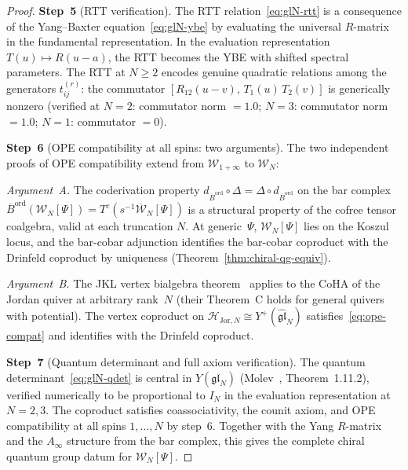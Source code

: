 \documentclass[11pt,reqno]{amsart}
\theoremstyle{definition}
\theoremstyle{remark}
\newcommand{\cH}{\mathcal{H}}
\newcommand{\cW}{\mathcal{W}}
\newcommand{\Ainf}{A_{\infty}}
\newcommand{\Barord}{\overline{B}^{\mathrm{ord}}}
\numberwithin{equation}{section}
\begin{document}
\begin{proof}
\medskip
\noindent
\textbf{Step~5}
(RTT verification).
The RTT relation~\eqref{eq:glN-rtt} is a consequence of
the Yang--Baxter equation~\eqref{eq:glN-ybe} by
evaluating the universal $R$-matrix in the
fundamental representation. In the evaluation
representation $T(u) \mapsto R(u - a)$, the RTT becomes
the YBE with shifted spectral parameters.
The RTT at
$N \geq 2$ encodes genuine quadratic relations among the
generators $t_{ij}^{(r)}$: the commutator
$[R_{12}(u-v),\, T_1(u)\, T_2(v)]$ is generically nonzero
(verified at $N = 2$: commutator norm $= 1.0$;
$N = 3$: commutator norm $= 1.0$;
$N = 1$: commutator $= 0$).

\medskip
\noindent
\textbf{Step~6}
(OPE compatibility at all spins: two arguments).
The two independent proofs of OPE compatibility extend
from $\cW_{1+\infty}$ to $\cW_N$:

\smallskip
\noindent\emph{Argument~A.}
The coderivation property
$d_{\Barord} \circ \Delta = \Delta \circ d_{\Barord}$
on the bar complex $\Barord(\cW_N[\Psi])
= T^c(s^{-1}\overline{\cW}_N[\Psi])$
is a structural property of the cofree tensor coalgebra,
valid at each truncation $N$. At generic~$\Psi$,
$\cW_N[\Psi]$ lies on the Koszul locus, and the
bar-cobar adjunction identifies the bar-cobar coproduct
with the Drinfeld coproduct by uniqueness
(Theorem~\ref{thm:chiral-qg-equiv}).

\smallskip
\noindent\emph{Argument~B.}
The JKL vertex bialgebra theorem~\cite{JKL26} applies to
the CoHA of the Jordan quiver at arbitrary rank~$N$
(their Theorem~C holds for general quivers with
potential). The vertex coproduct on
$\cH_{\mathrm{Jor},N}
\cong Y^+(\widehat{\mathfrak{gl}}_N)$
satisfies~\eqref{eq:ope-compat} and identifies with
the Drinfeld coproduct.

\medskip
\noindent
\textbf{Step~7}
(Quantum determinant and full axiom verification).
The quantum determinant~\eqref{eq:glN-qdet} is central
in $Y(\mathfrak{gl}_N)$
(Molev~\cite{Molev07}, Theorem~1.11.2),
verified numerically to be proportional to
$I_N$ in the evaluation representation at $N = 2, 3$.
The coproduct satisfies coassociativity, the counit axiom,
and OPE compatibility at all spins $1, \ldots, N$ by
step~6. Together with
the Yang $R$-matrix and the $\Ainf$ structure from the bar
complex, this gives the complete chiral quantum group
datum for $\cW_N[\Psi]$.
\end{proof}
\end{document}
